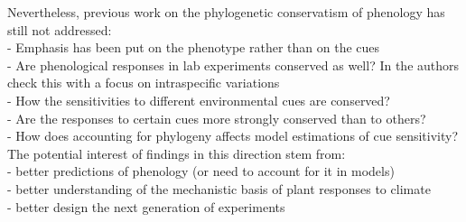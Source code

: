\documentclass{article}\usepackage[]{graphicx}\usepackage[]{color}
\begin{document}
Nevertheless, previous work on the phylogenetic conservatism of phenology has still not addressed:\\

- Emphasis has been put on the phenotype rather than on the cues\\
- Are phenological responses in lab experiments conserved as well? In \cite{joly2019importance} the authors check this with a focus on intraspecific variations\\
- How the sensitivities to different environmental cues are conserved?\\
- Are the responses to certain cues more strongly conserved than to others?\\
- How does accounting for phylogeny affects model estimations of cue sensitivity?\\


The potential interest of findings in this direction stem from:\\
- better predictions of phenology (or need to account for it in models)\\
- better understanding of the mechanistic basis of plant responses to climate\\
- better design the next generation of experiments \\
\end{document}
